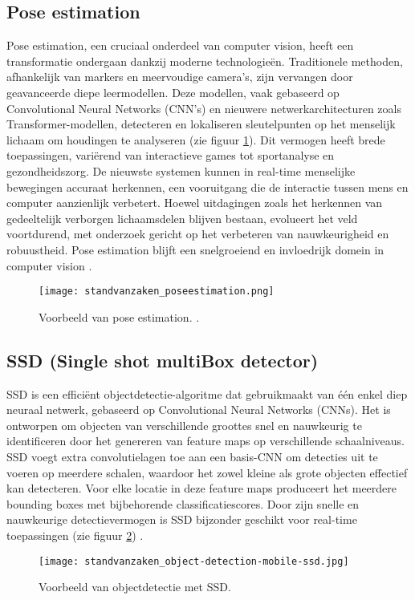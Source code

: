 \subsection{Pose estimation}
Pose estimation, een cruciaal onderdeel van computer vision, heeft een transformatie ondergaan dankzij moderne technologieën. Traditionele methoden, afhankelijk van markers en meervoudige camera's, zijn vervangen door geavanceerde diepe leermodellen. Deze modellen, vaak gebaseerd op Convolutional Neural Networks (CNN's) en nieuwere netwerkarchitecturen zoals Transformer-modellen, detecteren en lokaliseren sleutelpunten op het menselijk lichaam om houdingen te analyseren (zie figuur \ref{fig:standvanzaken_poseestimation}). Dit vermogen heeft brede toepassingen, variërend van interactieve games tot sportanalyse en gezondheidszorg.
De nieuwste systemen kunnen in real-time menselijke bewegingen accuraat herkennen, een vooruitgang die de interactie tussen mens en computer aanzienlijk verbetert. Hoewel uitdagingen zoals het herkennen van gedeeltelijk verborgen lichaamsdelen blijven bestaan, evolueert het veld voortdurend, met onderzoek gericht op het verbeteren van nauwkeurigheid en robuustheid. Pose estimation blijft een snelgroeiend en invloedrijk domein in computer vision \autocite{zheng2020deep}.
\newline
\begin{figure}[H]
  \centering
  \texttt{[image: standvanzaken\_poseestimation.png]}
  \caption{Voorbeeld van pose estimation. \cite{medium_human_pose}.}
  \label{fig:standvanzaken_poseestimation}  
\end{figure}
\newline
\subsection{SSD (Single shot multiBox detector)}
SSD is een efficiënt objectdetectie-algoritme dat gebruikmaakt van één enkel diep neuraal netwerk, gebaseerd op Convolutional Neural Networks (CNNs). 
Het is ontworpen om objecten van verschillende groottes snel en nauwkeurig te identificeren door het genereren van feature maps op verschillende schaalniveaus. 
SSD voegt extra convolutielagen toe aan een basis-CNN om detecties uit te voeren op meerdere schalen, waardoor het zowel kleine als grote objecten effectief kan detecteren. 
Voor elke locatie in deze feature maps produceert het meerdere bounding boxes met bijbehorende classificatiescores. 
Door zijn snelle en nauwkeurige detectievermogen is SSD bijzonder geschikt voor real-time toepassingen (zie figuur \ref{fig:standvanzaken_SSD}) \autocite{kumar2020object}.
\newline
\begin{figure}[H]
  \centering
  \texttt{[image: standvanzaken\_object-detection-mobile-ssd.jpg]}
  \caption{Voorbeeld van objectdetectie met SSD. \cite{automatic_addison_mobilenet}}
  \label{fig:standvanzaken_SSD}  
\end{figure}
\newline
